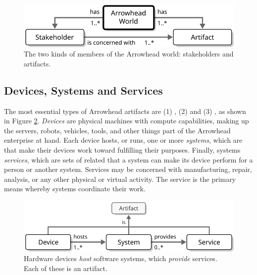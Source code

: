 \vfill

\begin{figure}[ht!]
  \centering
  \includegraphics[scale=0.9]{figures/world}
  \caption{
    The two kinds of members of the Arrowhead world: stakeholders and artifacts.
  }
  \label{fig:world}
\end{figure}

\vspace*{-3mm}

\subsection{Devices, Systems and Services}

The most essential types of Arrowhead artifacts are (1) , (2)  and (3) , as shown in Figure \ref{fig:device-system-service}.
\textit{Devices} are physical machines with compute capabilities, making up the servers, robots, vehicles, tools, and other things part of the Arrowhead enterprise at hand.
Each device hosts, or runs, one or more \textit{systems}, which are   that make their devices work toward fulfilling their purposes.
Finally, systems  \textit{services}, which are sets of related  that a system can make its device perform for a person or another system.
Services may be concerned with manufacturing, repair, analysis, or any other physical or virtual activity.
The service is the primary means whereby systems coordinate their work.

\vfill

\begin{figure}[ht!]
  \centering
  \includegraphics[scale=0.9]{figures/device-system-service}
  \caption{
    Hardware devices \textit{host} software systems, which \textit{provide} services.
    Each of these is an artifact.
  }
  \label{fig:device-system-service}
\end{figure}


